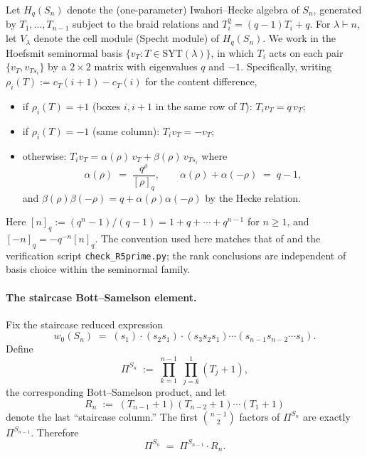 \documentclass[11pt]{article}
\theoremstyle{definition}
\newcommand{\Pis}[1]{\Pi^{S_{#1}}}
\newcommand{\Hq}[1]{H_q(S_{#1})}
\newcommand{\qint}[1]{[#1]_q}
\begin{document}
Let $\Hq{n}$ denote the (one-parameter) Iwahori--Hecke algebra of $S_n$, generated
by $T_1,\ldots,T_{n-1}$ subject to the braid relations and
$T_i^2 = (q-1)T_i + q$. For $\lambda \vdash n$, let $V_\lambda$ denote the
cell module (Specht module) of $\Hq{n}$. We work in the Hoefsmit
seminormal basis $\{v_T : T \in \mathrm{SYT}(\lambda)\}$, in which
$T_i$ acts on each pair $\{v_T, v_{T s_i}\}$ by a $2\times 2$ matrix
with eigenvalues $q$ and $-1$. Specifically, writing
$\rho_i(T) := c_T(i+1) - c_T(i)$ for the content difference,
\begin{itemize}[leftmargin=2em,topsep=0.2em,itemsep=0.1em]
\item if $\rho_i(T) = +1$ (boxes $i, i+1$ in the same row of $T$):
  $T_i v_T = q\, v_T$;
\item if $\rho_i(T) = -1$ (same column): $T_i v_T = -v_T$;
\item otherwise: $T_i v_T = \alpha(\rho)\, v_T + \beta(\rho)\, v_{Ts_i}$ where
  \begin{equation}\label{eq:alpha-def}
  \alpha(\rho) \;=\; \frac{q^\rho}{\qint{\rho}}, \qquad
  \alpha(\rho) + \alpha(-\rho) \;=\; q-1,
  \end{equation}
  and $\beta(\rho)\beta(-\rho) = q + \alpha(\rho)\alpha(-\rho)$ by the
  Hecke relation.
\end{itemize}
Here $\qint{n} := (q^n-1)/(q-1) = 1+q+\cdots+q^{n-1}$ for $n \ge 1$, and
$\qint{-n} = -q^{-n}\qint{n}$. The convention used here matches that of
\cite{Hoefsmit} and the verification script
\texttt{check\_R5prime.py}; the rank conclusions are independent of
basis choice within the seminormal family.

\paragraph{The staircase Bott--Samelson element.}
Fix the staircase reduced expression
\[
w_0(S_n) \;=\; (s_1)\cdot(s_2 s_1)\cdot(s_3 s_2 s_1)\cdots
(s_{n-1} s_{n-2}\cdots s_1).
\]
Define
\[
\Pis{n} \;:=\; \prod_{k=1}^{n-1}\;\prod_{j=k}^{1}(T_j+1),
\]
the corresponding Bott--Samelson product, and let
\begin{equation}\label{eq:Rn-def}
R_n \;:=\; (T_{n-1}+1)(T_{n-2}+1)\cdots(T_1+1)
\end{equation}
denote the last ``staircase column.''
The first $\binom{n-1}{2}$ factors of $\Pis{n}$ are exactly $\Pis{n-1}$.
Therefore
\begin{equation}\label{eq:Pi-recursion}
\Pis{n} \;=\; \Pis{n-1}\cdot R_n.
\end{equation}
\end{document}
